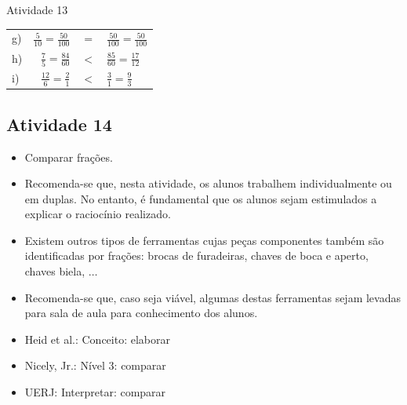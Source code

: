 \begin{multicols}{2}
\begin{resposta*}{Atividade 13}
\begin{tabular}{lrcl}
       g) &  $\frac{5}{10} = \frac{50}{100}$ &   $=$  &  $\frac{50}{100} =
\frac{50}{100}$ \\

       h) &  $\frac{7}{5} = \frac{84}{60}$ &   $<$  &  $\frac{85}{60} =
\frac{17}{12}$ \\

       i) &  $\frac{12}{6} = \frac{2}{1}$ &   $<$  &  $\frac{3}{1} =
\frac{9}{3}$ \\

    \end{tabular}
\end{resposta*}

\clearpage
\end{multicols}
\subsection{Atividade 14}

\begin{itemize} %
    \item       Comparar frações.
\end{itemize} %



\begin{itemize} %
    \item       Recomenda-se que, nesta atividade, os alunos trabalhem
individualmente ou em duplas. No entanto, é fundamental que os alunos sejam
estimulados a explicar o raciocínio realizado.
    \item       Existem outros tipos de ferramentas cujas peças componentes
também são identificadas por frações: brocas de furadeiras, chaves de boca e
aperto, chaves biela,       $\ldots$
    \item       Recomenda-se que, caso seja viável, algumas destas ferramentas
sejam levadas para sala de aula para conhecimento dos alunos.
\end{itemize} %


   \vspace{.1cm}

 \vspace{.1cm}

\begin{itemize} %
    \item       Heid et al.: Conceito: elaborar
    \item       Nicely, Jr.: Nível 3: comparar
    \item       UERJ: Interpretar: comparar
\end{itemize} %

